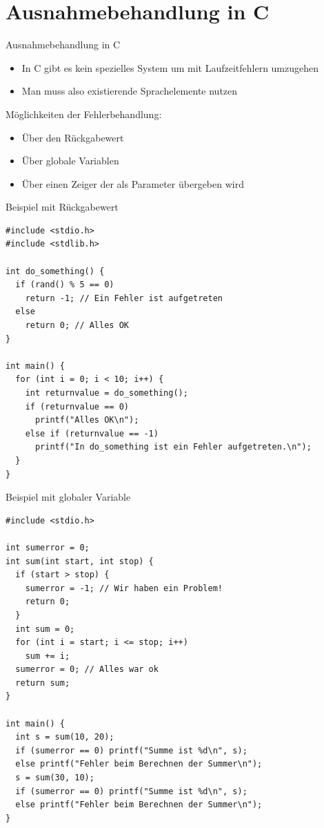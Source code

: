 \documentclass[presentation]{beamer}
\begin{document}
\section{Ausnahmebehandlung in C}
\label{sec:orgdaa5dc8}
\begin{frame}[label={sec:org12ea58b}]{Ausnahmebehandlung in C}
\begin{itemize}
\item In C gibt es \alert{kein spezielles System} um mit Laufzeitfehlern
umzugehen
\item Man muss also \alert{existierende Sprachelemente nutzen}
\end{itemize}
\begin{block}{Möglichkeiten der Fehlerbehandlung:}
\begin{itemize}
\item Über den \alert{Rückgabewert}
\item Über \alert{globale Variablen}
\item Über \alert{einen Zeiger} der als Parameter übergeben wird
\end{itemize}
\end{block}
\end{frame}
\begin{frame}[label={sec:org6d69a5e},fragile]{Beispiel mit Rückgabewert}
 \begin{verbatim}
#include <stdio.h>
#include <stdlib.h>

int do_something() {
  if (rand() % 5 == 0)
    return -1; // Ein Fehler ist aufgetreten
  else
    return 0; // Alles OK
}

int main() {
  for (int i = 0; i < 10; i++) {
    int returnvalue = do_something();
    if (returnvalue == 0)
      printf("Alles OK\n");
    else if (returnvalue == -1)
      printf("In do_something ist ein Fehler aufgetreten.\n");
  }
}
\end{verbatim}
\end{frame}
\begin{frame}[label={sec:orgb3f6ef4},fragile]{Beispiel mit globaler Variable}
 \begin{verbatim}
#include <stdio.h>

int sumerror = 0;
int sum(int start, int stop) {
  if (start > stop) {
    sumerror = -1; // Wir haben ein Problem!
    return 0;
  }
  int sum = 0;
  for (int i = start; i <= stop; i++)
    sum += i;
  sumerror = 0; // Alles war ok
  return sum;
}

int main() {
  int s = sum(10, 20);
  if (sumerror == 0) printf("Summe ist %d\n", s);
  else printf("Fehler beim Berechnen der Summer\n");
  s = sum(30, 10);
  if (sumerror == 0) printf("Summe ist %d\n", s);
  else printf("Fehler beim Berechnen der Summer\n");
}
\end{verbatim}
\end{frame}
\end{document}
